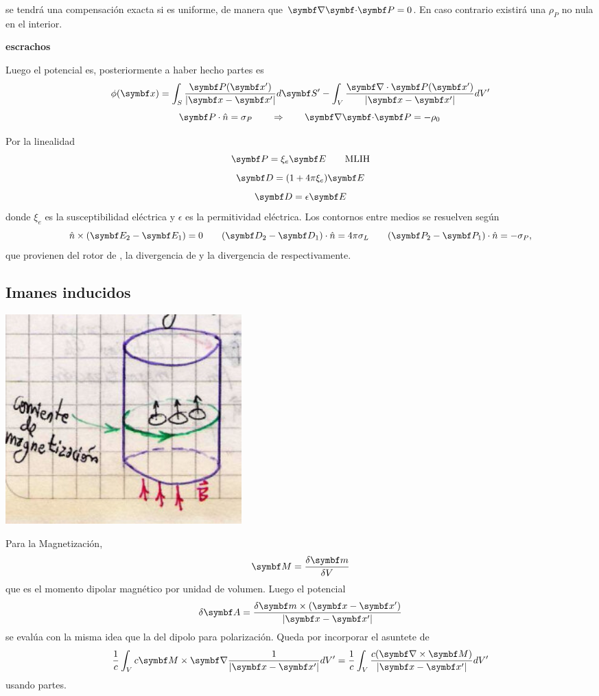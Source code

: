 \documentclass[10pt,oneside]{CBFT_book}
\begin{document}
se tendrá una compensación exacta si  es uniforme, de manera que $\divem{P}=0$. En caso
contrario existirá una $\rho_P$ no nula en el interior.

{\bf escrachos}



Luego el potencial es, posteriormente a haber hecho partes
es
\[
	\phi( \vb{x}) = \int_S \frac{\vb{P}(\vb{x}')}{|\vb{x}-\vb{x}'|} d\vb{S}' - 
	\int_V \frac{\Nabla\cdot\vb{P}(\vb{x}')}{|\vb{x}-\vb{x}'|}  dV'
\]
\[
	\qquad \vb{P}\cdot\hat{n} = \sigma_P \qquad \Rightarrow \qquad \divem{P} = -\rho_0
\]

Por la linealidad
\[
	\vb{P} = \xi_e \vb{E} \qquad \text{MLIH}
\]
\[
	\vb{D} = ( 1 + 4\pi\xi_e ) \vb{E} 
\]
\[
	\vb{D} = \epsilon \vb{E}
\]
donde $\xi_e$ es la susceptibilidad eléctrica y $\epsilon$ es la permitividad eléctrica.
Los contornos entre medios se resuelven según
\[
	\hat{n} \times (\vb{E}_2 -\vb{E}_1) = 0 \qquad 
	(\vb{D}_2 -\vb{D}_1)\cdot\hat{n} = 4 \pi \sigma_L \qquad 
	(\vb{P}_2 -\vb{P}_1)\cdot\hat{n} = - \sigma_P,
\]
que provienen del rotor de , la divergencia de  y la divergencia
de  respectivamente.

\subsection{Imanes inducidos}


\includegraphics[width=0.4\textwidth]{images/fig_ft1_imaninducidos.jpg}

Para la Magnetización,
\[
	\vb{M} = \frac{\delta \vb{m}}{\delta V}
\]
que es el momento dipolar magnético por unidad de volumen. Luego el potencial 
\[
	\delta\vb{A} = \frac{ \delta \vb{m} \times ( \vbx - \vbx') }{|\vbx - \vbx'|}
\]
se evalúa con la misma idea que la del dipolo para polarización.
Queda por incorporar el asuntete de 
\[
	\frac{1}{c} \int_V c \vb{M} \times \Nabla\frac{ 1 }{|\vb{x}-\vb{x}'|}  dV'
	= \frac{1}{c} \int_V \frac{ c(\rotorm{M}) }{|\vb{x}-\vb{x}'|}  dV'
\]
usando partes.
\end{document}
